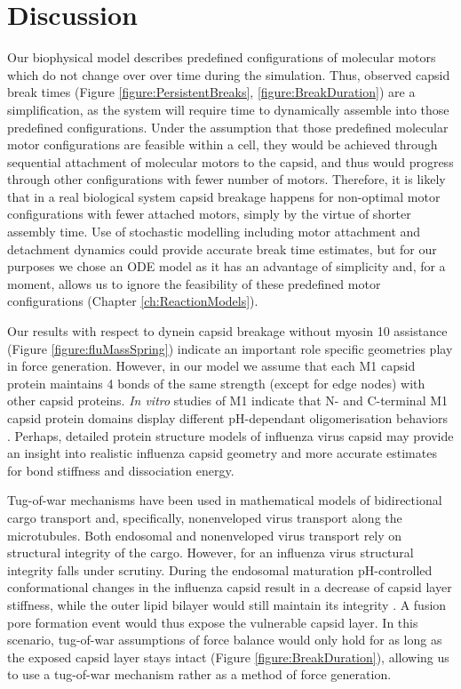 \section{Discussion}

Our biophysical model describes predefined configurations of molecular motors which do not change over over time during the simulation. Thus, observed capsid break times (Figure \ref{figure:PersistentBreaks}, \ref{figure:BreakDuration}) are a simplification, as the system will require time to dynamically assemble into those predefined configurations. Under the assumption that those predefined molecular motor configurations are feasible within a cell, they would be achieved through sequential attachment of molecular motors to the capsid, and thus would progress through other configurations with fewer number of motors. Therefore, it is likely that in a real biological system capsid breakage happens for non-optimal motor configurations with fewer attached motors, simply by the virtue of shorter assembly time. Use of stochastic modelling including motor attachment and detachment dynamics could provide accurate break time estimates, but for our purposes we chose an ODE model as it has an advantage of simplicity and, for a moment, allows us to ignore the feasibility of these predefined motor configurations (Chapter \ref{ch:ReactionModels}).

Our results with respect to dynein capsid breakage without myosin 10 assistance (Figure \ref{figure:fluMassSpring}) indicate an important role specific geometries play in force generation. However, in our model we assume that each M1 capsid protein maintains 4 bonds of the same strength (except for edge nodes) with other capsid proteins. \textit{In vitro} studies of M1 indicate that N- and C-terminal M1 capsid protein domains display different pH-dependant oligomerisation behaviors \cite{zhang2012dissection}. Perhaps, detailed protein structure models of influenza virus capsid may provide an insight into realistic influenza capsid geometry and more accurate estimates for bond stiffness and dissociation energy.

Tug-of-war mechanisms \cite{hancock2014bidirectional} have been used in mathematical models of bidirectional cargo transport \cite{muller2008tug} and, specifically, nonenveloped virus transport \cite{gazzola2009stochastic} along the microtubules. Both endosomal and nonenveloped virus transport rely on structural integrity of the cargo. However, for an influenza virus structural integrity falls under scrutiny. During the endosomal maturation pH-controlled conformational changes in the influenza capsid result in a decrease of capsid layer stiffness, while the outer lipid bilayer would still maintain its integrity \cite{li2014ph}. A fusion pore formation event would thus expose the vulnerable capsid layer. In this scenario, tug-of-war assumptions of force balance would only hold for as long as the exposed capsid layer stays intact (Figure \ref{figure:BreakDuration}), allowing us to use a tug-of-war mechanism rather as a method of force generation.

